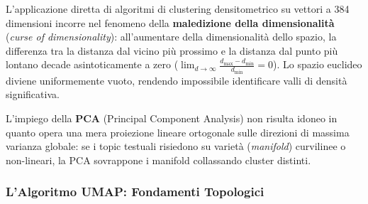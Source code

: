 L'applicazione diretta di algoritmi di clustering densitometrico su vettori a 384 dimensioni incorre nel fenomeno della \textbf{maledizione della dimensionalità} (\textit{curse of dimensionality}): all'aumentare della dimensionalità dello spazio, la differenza tra la distanza dal vicino più prossimo e la distanza dal punto più lontano decade asintoticamente a zero ($\lim_{d \to \infty} \frac{d_{\max} - d_{\min}}{d_{\min}} = 0$). Lo spazio euclideo diviene uniformemente vuoto, rendendo impossibile identificare valli di densità significativa.

L'impiego della \textbf{PCA} (Principal Component Analysis) non risulta idoneo in quanto opera una mera proiezione lineare ortogonale sulle direzioni di massima varianza globale: se i topic testuali risiedono su varietà (\textit{manifold}) curvilinee o non-lineari, la PCA sovrappone i manifold collassando cluster distinti.

\FloatBarrier
\subsubsection{L'Algoritmo UMAP: Fondamenti Topologici}
\label{subsec:lab-umap-algorithm}

